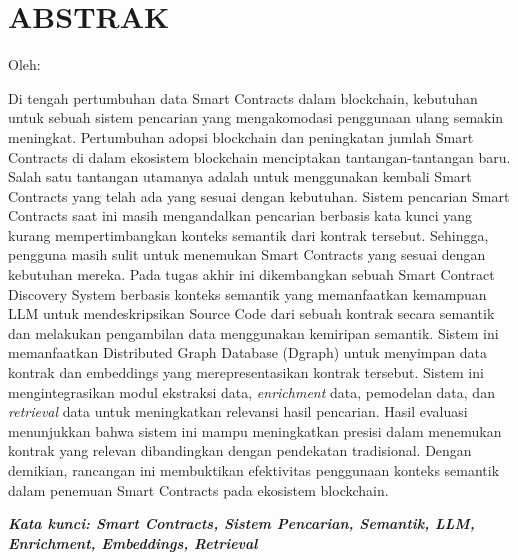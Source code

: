 \clearpage
\chapter*{ABSTRAK}
\begin{center}
	\center
	\begin{singlespace}
		\large\bfseries\MakeUppercase{\thetitle}

		\normalfont\normalsize
		Oleh:

		\bfseries \theauthor
	\end{singlespace}
\end{center}

\begin{singlespace}
	\small

    Di tengah pertumbuhan data Smart Contracts dalam blockchain, kebutuhan untuk sebuah sistem pencarian yang mengakomodasi penggunaan ulang semakin meningkat.
	Pertumbuhan adopsi blockchain dan peningkatan jumlah Smart Contracts di dalam ekosistem blockchain menciptakan tantangan-tantangan baru. Salah satu tantangan utamanya adalah untuk menggunakan kembali Smart Contracts yang telah ada yang sesuai dengan kebutuhan. Sistem pencarian Smart Contracts saat ini masih mengandalkan pencarian berbasis kata kunci yang kurang mempertimbangkan konteks semantik dari kontrak tersebut. Sehingga, pengguna masih sulit untuk menemukan Smart Contracts yang sesuai dengan kebutuhan mereka. Pada tugas akhir ini dikembangkan sebuah Smart Contract Discovery System berbasis konteks semantik yang memanfaatkan kemampuan LLM untuk mendeskripsikan Source Code dari sebuah kontrak secara semantik dan melakukan pengambilan data menggunakan kemiripan semantik. Sistem ini memanfaatkan Distributed Graph Database (Dgraph) untuk menyimpan data kontrak dan embeddings yang merepresentasikan kontrak tersebut. Sistem ini mengintegrasikan modul ekstraksi data, \textit{enrichment} data, pemodelan data, dan \textit{retrieval} data untuk meningkatkan relevansi hasil pencarian. Hasil evaluasi menunjukkan bahwa sistem ini mampu meningkatkan presisi dalam menemukan kontrak yang relevan dibandingkan dengan pendekatan tradisional. Dengan demikian, rancangan ini membuktikan efektivitas penggunaan konteks semantik dalam penemuan Smart Contracts pada ekosistem blockchain.

	\textbf{\textit{Kata kunci: Smart Contracts, Sistem Pencarian, Semantik, LLM, Enrichment, Embeddings, Retrieval}}

\end{singlespace}
\clearpage